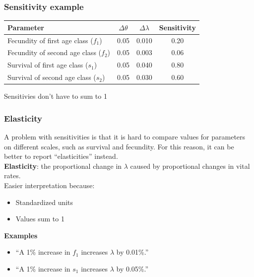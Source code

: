\documentclass[color=usenames,dvipsnames]{beamer}\usepackage[]{graphicx}\usepackage[]{xcolor}
\begin{document}
\begin{frame}
  \frametitle{Sensitivity example}
  \centering
  \small
  \begin{tabular}{lccc}
    \hline
    Parameter & $\Delta \theta$ & $\Delta \lambda$ & Sensitivity \\
    \hline
    Fecundity of first age class ($f_1$)  & 0.05 & 0.010 & 0.20 \\ %
    Fecundity of second age class ($f_2$) & 0.05 & 0.003 & 0.06 \\ %
    Survival of first age class ($s_1$)   & 0.05 & 0.040 & 0.80 \\ %
    Survival of second age class ($s_2$)   & 0.05 & 0.030 & 0.60 \\
    \hline
  \end{tabular}
  \vfill
  \normalsize
  \centering Sensitivies don't have to sum to 1 \par
\end{frame}


\begin{frame}
  \frametitle{Elasticity}
  A problem with sensitivities is that it is hard to compare values
  for parameters on different scales, such as survival and
  fecundity. For this reason, it can be better to report
  ``elasticities'' instead. \\
  \pause
  \vfill
  {\bf Elasticity}: the proportional change in $\lambda$ caused by
  proportional changes in vital rates. \\
  \pause
  \vfill
   Easier interpretation because: %
   \begin{itemize}
     \item Standardized units
     \item Values sum to 1
   \end{itemize}
   \pause
   \vfill
   {\bf Examples}
  \begin{itemize}
    \item[] ``A 1\% increase in $f_1$ increases $\lambda$ by 0.01\%.''
    \item[] ``A 1\% increase in $s_1$ increases $\lambda$ by 0.05\%.''
  \end{itemize}

\end{frame}
\end{document}
